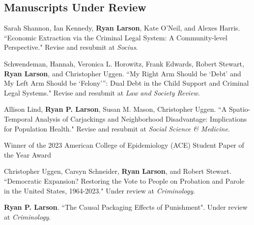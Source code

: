 \documentclass[letterpaper]{article}
\renewenvironment{itemize}{
  \begin{list}{}{
    \setlength{\leftmargin}{1.5em}
  }
}{
  \end{list}
}
\begin{document}
\subsection*{Manuscripts Under Review}
\begin{itemize}

\item Sarah Shannon, Ian Kennedy, \textbf{Ryan Larson}, Kate O'Neil, and Alexes Harris. ``Economic Extraction via the Criminal Legal System: A Community-level Perspective." Revise and resubmit at \textit{Socius}. 

\item Schwendeman, Hannah, Veronica L. Horowitz, Frank Edwards, Robert Stewart,  \textbf{Ryan Larson}, and Christopher Uggen. ``My Right Arm Should be ‘Debt’ and My Left Arm Should be ‘Felony’”: Dual Debt in the Child Support and Criminal Legal Systems." Revise and resubmit at \textit{Law and Society Review}. 

\item Allison Lind, \textbf{Ryan P. Larson}, Susan M. Mason, Christopher Uggen. ``A Spatio-Temporal Analysis of Carjackings and Neighborhood Disadvantage: Implications for Population Health." Revise and resubmit at \textit{Social Science \& Medicine}.
\begin{itemize}
\item Winner of the 2023 American College of Epidemiology (ACE) Student Paper of the Year Award
\end{itemize}

\item Christopher Uggen, Carsyn Schneider, \textbf{Ryan Larson}, and Robert Stewart. ``Democratic Expansion? Restoring the Vote to People on Probation and Parole in the United States, 1964-2023." Under review at \textit{Criminology}.

\item \textbf{Ryan P. Larson}. ``The Causal Packaging Effects of Punishment". Under review at \textit{Criminology}.


\end{itemize}
\end{document}
